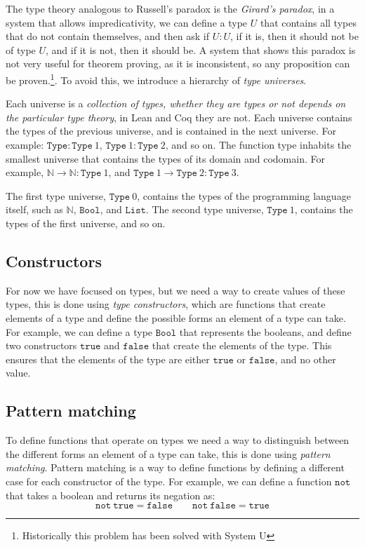 \documentclass[
  a4paper, 
  10pt, 
  parskip=half, 
  DIV=20,
  toc=bibliography,
  usegeometry,
]{scrartcl}
\begin{document}
The type theory analogous to Russell's paradox is the \emph{Girard's paradox}, in
a system that allows impredicativity, we can define a type \(U\) that contains all
types that do not contain themselves, and then ask if \(U: U\), if it is, then it
should not be of type \(U\), and if it is not, then it should be. A system that
shows this paradox is not very useful for theorem proving, as it is
inconsistent, so any proposition can be proven.\footnote{
  Historically this problem has been solved with System U}. 
To avoid this, we introduce a hierarchy of \emph{type universes}.

Each universe is a \emph{collection of types, whether they are types or not
depends on the particular type theory}, in Lean and Coq they are not. Each
universe contains the types of the previous universe, and is contained in the
next universe. For example: \(\texttt{Type}: \texttt{Type} \ 1\),
\(\texttt{Type} \ 1: \texttt{Type} \ 2\), and so on. The function type inhabits
the smallest universe that contains the types of its domain and codomain. For
example, \(\mathbb{N} \to \mathbb{N}: \texttt{Type} \ 1\), and
\(\texttt{Type} \ 1 \to \texttt{Type} \ 2: \texttt{Type} \ 3\).

The first type universe, \(\texttt{Type} \ 0\), contains the types of the
programming language itself, such as \(\mathbb{N}\), \(\texttt{Bool}\), and
\(\texttt{List}\). The second type universe, \(\texttt{Type} \ 1\), contains the
types of the first universe, and so on.

\subsection{Constructors}

For now we have focused on types, but we need a way to create values of these
types, this is done using \emph{type constructors}, which are functions that
create elements of a type and define the possible forms an element of a type can
take. For example, we can define a type \(\texttt{Bool}\) that represents the
booleans, and define two constructors \(\texttt{true}\) and \(\texttt{false}\) that
create the elements of the type. This ensures that the elements of the type are
either \(\texttt{true}\) or \(\texttt{false}\), and no other value.

\subsection{Pattern matching}

To define functions that operate on types we need a way to distinguish between
the different forms an element of a type can take, this is done using
\emph{pattern matching}. Pattern matching is a way to define functions by
defining a different case for each constructor of the type. For example, we can
define a function \(\texttt{not}\) that takes a boolean and returns its negation
as:
\[
  \texttt{not} \ \texttt{true} = \texttt{false} \qquad
  \texttt{not} \ \texttt{false} = \texttt{true}
\]
\end{document}
